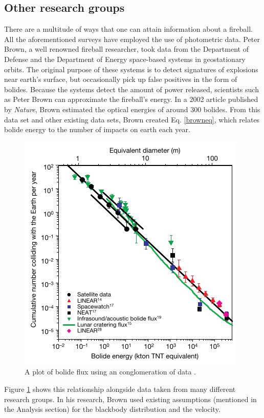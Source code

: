 \subsection{Other research groups}

There are a multitude of ways that one can attain information about a fireball.  
All the aforementioned surveys have employed the use of photometric data.
Peter Brown, a well renowned fireball researcher, took data from the Department of Defense and the Department of Energy space-based systems in geostationary orbits.
The original purpose of these systems is to detect signatures of explosions near earth's surface, but occasionally pick up false positives in the form of bolides.  
Because the systems detect the amount of power released, scientists such as Peter Brown can approximate the fireball's energy.
In a 2002 article published by \textit{Nature}, Brown estimated the optical energies of around 300 bolides.
From this data set and other existing data sets, Brown created Eq. \ref{browneq}, which relates bolide energy to the number of impacts on earth each year. 

\begin{figure}[ht!]
  \centering
  \includegraphics[scale=0.7]{images/flux_brown.png}
  \caption{A plot of bolide flux using an conglomeration of data \cite{brown_p_flux_2002}.}
  \label{powerlaw}
\end{figure}


Figure \ref{powerlaw} shows this relationship alongside data taken from many different research groups.  
In his research, Brown used existing assumptions (mentioned in the Analysis section) for the blackbody distribution and the velocity.  



